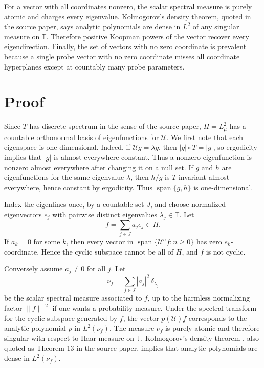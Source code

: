 \documentclass[11pt]{amsart}
\theoremstyle{remark}
\newcommand{\T}{\mathbb T}
\newcommand{\U}{\mathcal U}
\begin{document}
For a vector with all coordinates nonzero, the scalar spectral measure is
purely atomic and charges every eigenvalue. Kolmogorov's density theorem,
quoted in the source paper, says analytic polynomials are dense in
\(L^2\) of any singular measure on \(\T\). Therefore positive Koopman powers
of the vector recover every eigendirection. Finally, the set of vectors with
no zero coordinate is prevalent because a single probe vector with no zero
coordinate misses all coordinate hyperplanes except at countably many probe
parameters.

\section*{Proof}

Since \(T\) has discrete spectrum in the sense of the source paper,
\(H=L^2_\mu\) has a countable orthonormal basis of eigenfunctions for \(\U\).
We first note that each eigenspace is one-dimensional. Indeed, if
\(\U g=\lambda g\), then \(|g|\circ T=|g|\), so ergodicity implies that
\(|g|\) is almost everywhere constant. Thus a nonzero eigenfunction is
nonzero almost everywhere after changing it on a null set. If \(g\) and \(h\)
are eigenfunctions for the same eigenvalue \(\lambda\), then \(h/g\) is
\(T\)-invariant almost everywhere, hence constant by ergodicity. Thus
\(\operatorname{span}\{g,h\}\) is one-dimensional.

Index the eigenlines once, by a countable set \(J\), and choose normalized
eigenvectors \(e_j\) with pairwise distinct eigenvalues \(\lambda_j\in\T\).
Let
\[
        f=\sum_{j\in J} a_j e_j\in H.
\]
If \(a_k=0\) for some \(k\), then every vector in
\(\operatorname{span}\{\U^n f:n\ge 0\}\) has zero \(e_k\)-coordinate. Hence
the cyclic subspace cannot be all of \(H\), and \(f\) is not cyclic.

Conversely assume \(a_j\ne 0\) for all \(j\). Let
\[
        \nu_f=\sum_{j\in J}|a_j|^2\,\delta_{\lambda_j}
\]
be the scalar spectral measure associated to \(f\), up to the harmless
normalizing factor \(\|f\|^{-2}\) if one wants a probability measure. Under
the spectral transform for the cyclic subspace generated by \(f\), the vector
\(p(\U)f\) corresponds to the analytic polynomial \(p\) in
\(L^2(\nu_f)\). The measure \(\nu_f\) is purely atomic and therefore singular
with respect to Haar measure on \(\T\). Kolmogorov's density theorem
\cite[Theorem 2.11.5]{Simon}, also quoted as Theorem 13 in the source paper,
implies that analytic polynomials are dense in \(L^2(\nu_f)\).
\end{document}
